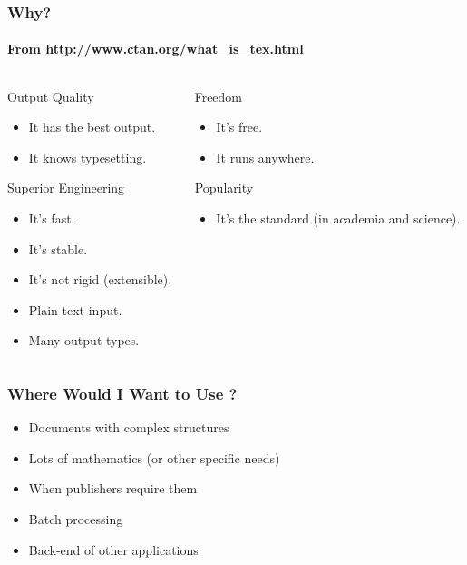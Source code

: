 \begin{frame}
\frametitle{Why?}
\framesubtitle{From \url{http://www.ctan.org/what_is_tex.html}}
\begin{columns}[T]
\begin{column}{.46\textwidth}
\begin{block}{Output Quality}
\begin{itemize}
\item It has the best output.
\item It knows typesetting.
\end{itemize}
\end{block}

\begin{block}{Superior Engineering}
\begin{itemize}
\item It's fast.
\item It's stable.
\item It's not rigid (extensible).
\item Plain text input.
\item Many output types.
\end{itemize}
\end{block}
\end{column}

\begin{column}{.46\textwidth}
\begin{block}{Freedom}
\begin{itemize}
\item It's free.
\item It runs anywhere.
\end{itemize}
\end{block}

\begin{block}{Popularity}
\begin{itemize}
\item It's the standard (in academia and science).
\end{itemize}
\end{block}
\end{column}
\end{columns}
\end{frame}

\begin{frame}
\frametitle{Where Would I Want to Use ?}
\begin{itemize}
\item Documents with complex structures
\item Lots of mathematics \pause(or other specific needs)\pause
\item When publishers \alert{require} them
\pause
\item Batch processing
\pause
\item Back-end of other applications
\end{itemize}
\end{frame}

